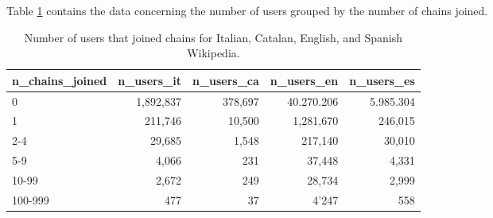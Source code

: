 Table \ref{table:usersmorechains} contains the data concerning the number of users grouped by the number of chains joined.

\begin{table}[H]
    \centering
    \begin{tabularx}{\columnwidth}{@{}Xrrrr@{}}
        \midrule
        \textbf{n\_chains\_joined} & \textbf{n\_users\_it} & \textbf{n\_users\_ca}& \textbf{n\_users\_en} & \textbf{n\_users\_es}  \\ \toprule
        0 & 1,892,837 & 378,697& 40.270.206& 5.985.304\\
        1   & 211,746 & 10,500 & 1,281,670& 246,015\\
        2-4 & 29,685  & 1,548 & 217,140& 30,010\\
        5-9 & 4,066   & 231 & 37,448& 4,331\\
        10-99 & 2,672 & 249 & 28,734& 2,999\\
        100-999 & 477& 37  & 4'247 & 558\\
        \bottomrule
    \end{tabularx}
    \caption{Number of users that joined chains for Italian, Catalan, English, and Spanish Wikipedia.\label{table:usersmorechains}}
\end{table}

        
    
